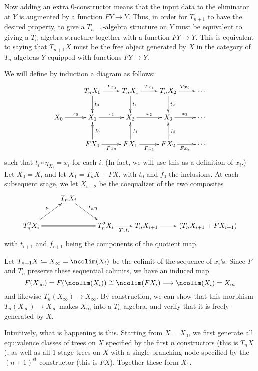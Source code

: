 \documentclass{amsart}
\begin{document}
Now adding an extra 0-constructor means that the input data to the eliminator at $Y$ is augmented by a function $FY\to Y$.
Thus, in order for $T_{n+1}$ to have the desired property, to give a $T_{n+1}$-algebra structure on $Y$ must be equivalent to giving a $T_n$-algebra structure together with a function $F Y \to Y$.
This is equivalent to saying that $T_{n+1} X$ must be the free object generated by $X$ in the category of $T_n$-algebras $Y$ equipped with functions $F Y \to Y$.

We will define by induction a diagram as follows:
\begin{equation}
  \vcenter{\xymatrix{
       &
       T_n X_0\ar[r]^{T x_0}\ar[d]^{t_0} &
       T_n X_1\ar[r]^{T x_1}\ar[d]^{t_1} &
       T_n X_2\ar[r]^{T x_2}\ar[d]^{t_2} &
       \cdots \\
       X_0\ar[r]^{x_0} &
       X_1\ar[r]^{x_1} &
       X_2\ar[r]^{x_2} &
       X_3\ar[r]^{x_3} &
       \cdots \\
       & F X_0\ar[r]_{F x_0}\ar[u]_{f_0} &
       F X_1\ar[r]_{F x_1}\ar[u]_{f_1} &
       F X_2\ar[r]_{F x_2}\ar[u]_{f_2} &
       \cdots
      }}
\end{equation}
such that $t_i \circ \eta_{X_i}= x_i$ for each $i$.
(In fact, we will use this as a definition of $x_i$.)
Let $X_0=X$, and let $X_1 = T_n X + F X$, with $t_0$ and $f_0$ the inclusions.
At each subsequent stage, we let $X_{i+2}$ be the coequalizer of the two composites
\begin{equation}
  \vcenter{\xymatrix{
      & T_n X_i \ar[dr]^{T_n \eta}\\
      T_n^2 X_i \ar@{=}[rr]\ar[ur]^{\mu} &&
      T_n^2 X_i \ar[r]_-{T_n t_i } &
      T_n X_{i+1}\ar[r] &
      (T_n X_{i+1}+ F X_{i+1})
    }}
\end{equation}
with $t_{i+1}$ and $f_{i+1}$ being the components of the quotient map.

Let $T_{n+1} X \coloneqq X_\infty = \ncolim (X_i)$ be the colimit of the sequence of $x_i$'s.
Since $F$ and $T_n$ preserve these sequential colimits, we have an induced map
\[F(X_\infty) = F(\ncolim(X_i)) \cong \ncolim (F X_i) \too \ncolim (X_i) = X_\infty\]
and likewise $T_n (X_\infty) \to X_\infty$.
By construction, we can show that this morphism $T_n (X_\infty) \to X_\infty$ makes $X_\infty$ into a $T_n$-algebra, and verify that it is freely generated by $X$.

Intuitively, what is happening is this.
Starting from $X=X_0$, we first generate all equivalence classes of trees on $X$ specified by the first $n$ constructors (this is $T_n X$), as well as all 1-stage trees on $X$ with a single branching node specified by the $(n+1)^{\mathrm{st}}$ constructor (this is $F X$).
Together these form $X_1$.
\end{document}
